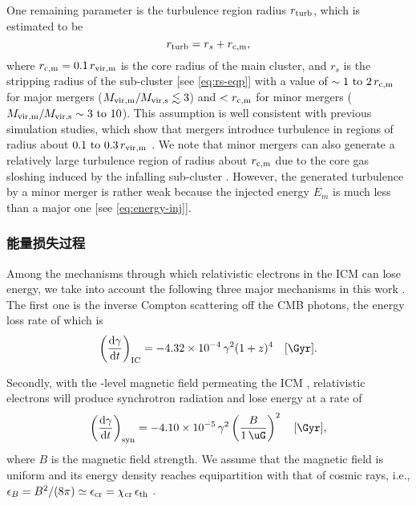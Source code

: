 One remaining parameter is the turbulence region radius $r_{\mathrm{turb}}$,
which is estimated to be
\begin{equation}
  \label{eq:radius-turb}
  r_{\mathrm{turb}} = r_s + r_{\mathrm{c,m}} ,
\end{equation}
where
$r_{\mathrm{c,m}} = 0.1 \,r_{\mathrm{vir,m}}$ is the core radius of the main cluster,
and $r_s$ is the stripping radius of the sub-cluster
[see \autoref{eq:rs-eqp}]
with a value of $\sim \numrange{1}{2} \,r_{\R{c,m}}$
for major mergers ($M_{\mathrm{vir,m}} / M_{\mathrm{vir,s}} \lesssim 3$)
and $< r_{\mathrm{c,m}}$ for minor mergers
($M_{\R{vir,m}} / M_{\R{vir,s}} \sim \numrange{3}{10}$).
This assumption is well consistent with previous simulation studies, which
show that mergers introduce turbulence in regions of radius about
$\numrange{0.1}{0.3} \,r_{\R{vir,m}}$
\cite{vazza2011,vazza2012,miniati2015ss}.
We note that minor mergers can also generate
a relatively large turbulence region of radius about $r_{\mathrm{c,m}}$
due to the core gas sloshing induced by the infalling sub-cluster
\cite{vazza2012}.
However, the generated turbulence by a minor merger is rather weak because
the injected energy $E_m$ is much less than a major one
[see \autoref{eq:energy-inj}].

\subsubsection{能量损失过程}

Among the mechanisms through which relativistic electrons
in the ICM can lose energy, we take into account the following three
major mechanisms in this work \cite{sarazin1999}.
The first one is the inverse Compton scattering off the CMB photons,
the energy loss rate of which is
\begin{equation}
  \label{eq:eloss-ic}
  \left( \diff{\gamma}{t} \right)_{\R{IC}} =
    \num{-4.32e-4} \,\gamma^2 (1+z)^4
    \quad [\si{\per\Gyr}].
\end{equation}

Secondly, with the \si{\uG}-level magnetic field permeating the ICM
\cite{govoni2004,ryu2008}, relativistic electrons will
produce synchrotron radiation and lose energy at a rate of
\begin{equation}
  \label{eq:eloss-syn}
  \left( \diff{\gamma}{t} \right)_{\R{syn}} =
    \num{-4.10e-5} \,\gamma^2 \left( \frac{B}{\SI{1}{\uG}} \right)^2
    \quad [\si{\per\Gyr}],
\end{equation}
where $B$ is the magnetic field strength.
We assume that the magnetic field is uniform and its energy density reaches
equipartition with that of cosmic rays, i.e.,
$\epsilon_B = B^2/(8\pi) \simeq \epsilon_{\mathrm{cr}} = \chi_{\mathrm{cr}}\,\epsilon_{\mathrm{th}}$
\cite{beck2005}.

